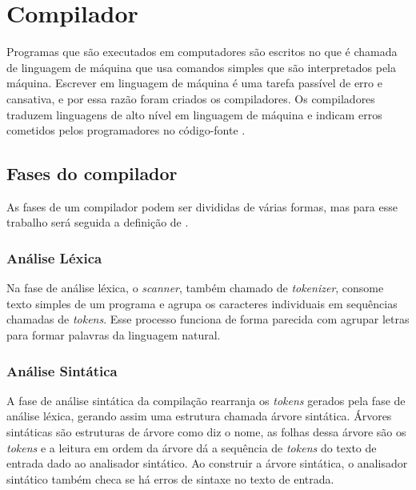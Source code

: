 \label{cap:fundamentacao-teorica}

\section{Compilador}
Programas que são executados em computadores são escritos no que é chamada de linguagem de máquina que usa comandos simples que são interpretados pela máquina. Escrever em linguagem de máquina é uma tarefa passível de erro e cansativa, e por essa razão foram criados os compiladores. Os compiladores traduzem linguagens de alto nível em linguagem de máquina e indicam erros cometidos pelos programadores no código-fonte \cite{mogensen2024introduction}.

\subsection{Fases do compilador}
As fases de um compilador podem ser divididas de várias formas, mas para esse trabalho será seguida a definição de \textcite{thain2020introduction}. 


\begin{figure}[ht]
    \captionsetup{width=16cm}
\end{figure}
\FloatBarrier
\subsubsection{Análise Léxica}
Na fase de análise léxica, o \textit{scanner}, também chamado de \textit{tokenizer}, consome texto simples de um programa e agrupa os caracteres individuais em sequências chamadas de \textit{tokens}. Esse processo funciona de forma parecida com agrupar letras para formar palavras da linguagem natural.

\subsubsection{Análise Sintática}
A fase de análise sintática da compilação rearranja os \textit{tokens} gerados pela fase de análise léxica, gerando assim uma estrutura chamada árvore sintática. Árvores sintáticas são estruturas de árvore como diz o nome, as folhas dessa árvore são os \textit{tokens} e a leitura em ordem da árvore dá a sequência de \textit{tokens} do texto de entrada dado ao analisador sintático. Ao construir a árvore sintática, o analisador sintático também checa se há erros de sintaxe no texto de entrada.

